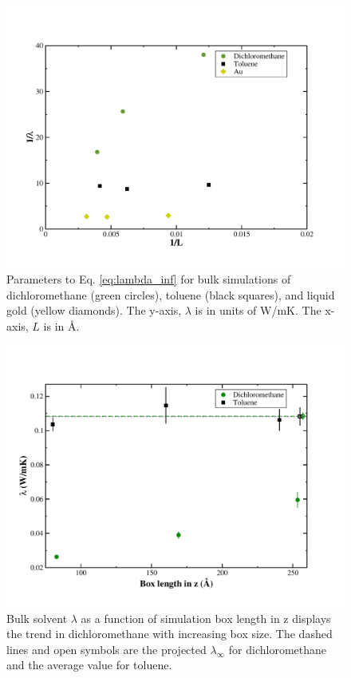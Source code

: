 \begin{figure}[h]
    \includegraphics[scale=0.5]{figures/inverselambda-solvent.pdf}
    \caption{ Parameters to Eq. \ref{eq:lambda_inf} for bulk simulations of dichloromethane (green circles), toluene (black squares), and liquid gold (yellow diamonds). The y-axis, $\lambda$ is in units of W/mK. The x-axis, $L$ is in \AA.}
    \label{fig:inverselambda}
\end{figure}

\begin{figure}[h]
    \includegraphics[scale=0.5]{figures/lambda-bulk.pdf}
    \caption{ Bulk solvent $\lambda$ as a function of simulation box length in z displays the trend in dichloromethane with increasing box size. The dashed lines and open symbols are the projected $\lambda_{\infty}$ for dichloromethane and the average value for toluene.}
    \label{fig:lambda-bulk}
\end{figure}


